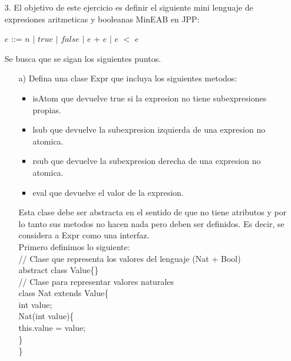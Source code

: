 \documentclass{article}
\begin{document}
    \begin{itemize}
        \item[3.] El objetivo de este ejercicio es definir el siguiente mini lenguaje de expresiones aritmeticas y booleanas MinEAB en JPP:
        \begin{center}
            \center $e$ ::= $n$ $|$ $true$ $|$ $false$ $|$ $e$ + $e$ $|$ $e$ $<$ $e$
        \end{center}

        Se busca que se sigan los siguientes puntos.

        \begin{itemize}
            \item[a)] Defina una clase Expr que incluya los siguientes metodos:
                \begin{itemize}
                    \item isAtom que devuelve true si la expresion no tiene subexpresiones propias.
                    \item lsub que devuelve la subexpresion izquierda de una expresion no atomica.
                    \item rsub que devuelve la subexpresion derecha de una expresion no atomica.
                    \item eval que devuelve el valor de la expresion.
                \end{itemize}
            Esta clase debe ser abstracta en el sentido de que no tiene atributos y por lo tanto sus metodos no hacen nada pero deben ser definidos. Es decir, se considera a Expr como una interfaz.\\

            Primero definimos lo siguiente:\\

            // Clase que representa los valores del lenguaje (Nat + Bool)\\
            abstract class Value\{\}\\

            // Clase para representar valores naturales\\
            class Nat extends Value\{\\
            \hspace*{0.6cm}int value;\\

            \hspace*{0.6cm}Nat(int value)\{\\
            \hspace*{1.2cm}this.value = value;\\
            \hspace*{0.6cm}\}\\
            \}\\


\end{itemize}
\end{itemize}
\end{document}

